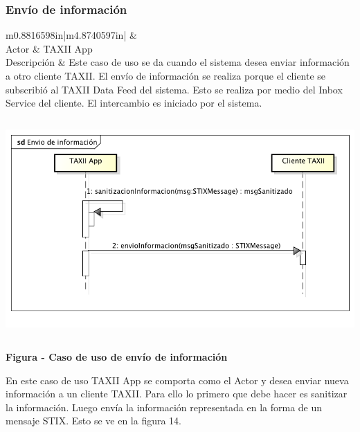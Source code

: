 \subsubsection{Envío de información}
\begin{flushleft}
	\tablefirsthead{}
	\tablehead{}
	\tabletail{}
	\tablelasttail{}
	\begin{supertabular}{m{0.8816598in}|m{4.8740597in}|}
		 &
		\\\hline
		{ Actor} &
		{ TAXII App}\\
		{ Descripción} &
		{ Este caso de uso se da cuando el sistema desea enviar información a otro cliente
			TAXII. El envío de información se realiza porque el cliente se subscribió al TAXII Data Feed del sistema. Esto se
			realiza por medio del Inbox Service del cliente. El intercambio es iniciado por el sistema.}\\\hhline{~-}
	\end{supertabular}
\end{flushleft}
\begin{center}
	{\centering  \includegraphics[width=5.7638in,height=3.2764in]{Analisis22-img/Analisis22-img029.png} \par}
	{\centering{}\bfseries
		\foreignlanguage{spanish}{Figura }\foreignlanguage{spanish}{ - Caso de uso de envío de
			información}
		\par}
\end{center}

{
	En este caso de uso TAXII App se comporta como el Actor y desea enviar nueva información a un cliente TAXII. Para ello
	lo primero que debe hacer es sanitizar la información. Luego envía la información representada en la forma de un
	mensaje STIX. Esto se ve en la figura 14.}
\newpage
